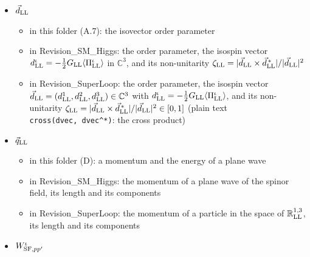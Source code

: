 \documentclass[
  10pt,
]{article}
\providecommand{\tightlist}{%
  \setlength{\itemsep}{0pt}\setlength{\parskip}{0pt}}
\begin{document}
\begin{itemize}
  \begin{itemize}
  \tightlist
  \item
    in this folder (A.7, B.7, D): a momentum and the energy of a plane
    wave
  \item
    in Revision\_SM\_Higgs: the free energy
    \(\varepsilon_{\rm LL}=(q_{\rm LL}^2+m_{\rm LL}^2)^{1/2}\) and the
    quasi-particle energies of the scalar pair channel
    \(E^\pm_{\rm LL}=[(\varepsilon_{\rm LL}\pm\mu_{\rm LL})^2+\Delta_{\rm LL}^2]^{1/2}\)
  \item
    in Revision\_SuperLoop: the energy
    \(\varepsilon_{\rm LL}=(q_{\rm LL}^2+m_{\rm LL}^2)^{1/2}\), the
    quasi-particle energies of the scalar channel
    \(E^\pm_{\rm LL}=[(\varepsilon_{\rm LL}\pm\mu_{\rm LL})^2+\Delta_{\rm LL}^2]^{1/2}\),
    a function of the gap (written \(E^\pm_{\rm LL}(\Delta^+_{\rm LL})\)
    and \(E^\pm_{\rm LL}(\Delta^-_{\rm LL})\) when \(\Delta_{\rm LL}\)
    is replaced by one of the two gaps of a general state), and those of
    the pseudoscalar channel,
    \((\tilde E^\pm_{\rm LL})^2=\varepsilon_{\rm LL}^2+\mu_{\rm LL}^2+\Delta_{\rm LL}^2\pm2[\mu_{\rm LL}^2\varepsilon_{\rm LL}^2+m_{\rm LL}^2\Delta_{\rm LL}^2]^{1/2}\)
  \end{itemize}
\item
  \(\vec d_{\rm LL}\)

  \begin{itemize}
  \tightlist
  \item
    in this folder (A.7): the isovector order parameter
  \item
    in Revision\_SM\_Higgs: the order parameter, the isospin vector
    \(d^\iota_{\rm LL}=-\tfrac12G_{\rm LL}\langle\Pi^\iota_{\rm LL}\rangle\)
    in \(\mathbb C^3\), and its non-unitarity
    \(\zeta_{\rm LL}=\lvert\vec d_{\rm LL}\times\vec d^{\,*}_{\rm LL}\rvert/\lvert\vec d_{\rm LL}\rvert^2\)
  \item
    in Revision\_SuperLoop: the order parameter, the isospin vector
    \(\vec d_{\rm LL}=(d^1_{\rm LL},d^2_{\rm LL},d^3_{\rm LL})\in\mathbb C^3\)
    with
    \(d^\iota_{\rm LL}=-\tfrac12G_{\rm LL}\langle\Pi^\iota_{\rm LL}\rangle\),
    and its non-unitarity
    \(\zeta_{\rm LL}=\lvert\vec d_{\rm LL}\times\vec d^{\,*}_{\rm LL}\rvert/\lvert\vec d_{\rm LL}\rvert^2\in[0,1]\)
    (plain text \texttt{cross(dvec,\ dvec\^{}*)}: the cross product)
  \end{itemize}
\item
  \(\vec q_{\rm LL}\)

  \begin{itemize}
  \tightlist
  \item
    in this folder (D): a momentum and the energy of a plane wave
  \item
    in Revision\_SM\_Higgs: the momentum of a plane wave of the spinor
    field, its length and its components
  \item
    in Revision\_SuperLoop: the momentum of a particle in the space of
    \(\mathbb R^{1,3}_{\rm LL}\), its length and its components
  \end{itemize}
\item
  \(W^\iota_{{\rm SF},pp'}\)


\end{itemize}
\end{document}
